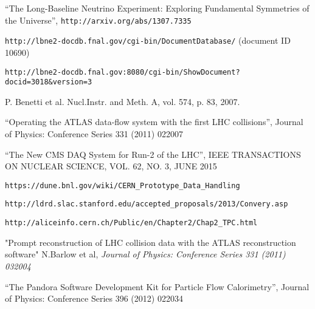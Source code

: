 \begin{thebibliography}{99}

 ``The Long-Baseline Neutrino Experiment: Exploring Fundamental Symmetries of the Universe'',  \verb!http://arxiv.org/abs/1307.7335!

 \verb!http://lbne2-docdb.fnal.gov/cgi-bin/DocumentDatabase/! (document ID 10690)

 \verb!http://lbne2-docdb.fnal.gov:8080/cgi-bin/ShowDocument?docid=3018&version=3!

 P. Benetti et al. Nucl.Instr. and Meth. A, vol. 574, p. 83, 2007.

 ``Operating the ATLAS data-flow system with the first LHC collisions'', Journal of Physics: Conference Series 331 (2011) 022007

 ``The New CMS DAQ System for Run-2 of the LHC'', IEEE TRANSACTIONS ON NUCLEAR SCIENCE, VOL. 62, NO. 3, JUNE 2015

 \verb!https://dune.bnl.gov/wiki/CERN_Prototype_Data_Handling!

 \verb!http://ldrd.slac.stanford.edu/accepted_proposals/2013/Convery.asp!

 \verb!http://aliceinfo.cern.ch/Public/en/Chapter2/Chap2_TPC.html!

 "Prompt reconstruction of LHC collision data with the ATLAS reconstruction software" N.Barlow et al, \textit{Journal of Physics: Conference Series 331 (2011) 032004}

 ``The Pandora Software Development Kit for Particle Flow Calorimetry'', Journal of Physics: Conference Series 396 (2012) 022034

\end{thebibliography}